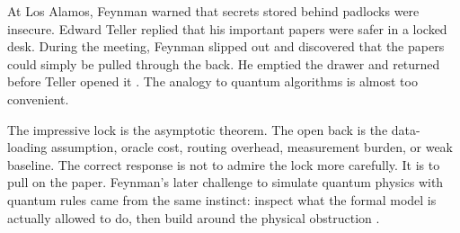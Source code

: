 At Los Alamos, Feynman warned that secrets stored behind padlocks were insecure. Edward Teller replied that his important papers were safer in a locked desk. During the meeting, Feynman slipped out and discovered that the papers could simply be pulled through the back. He emptied the drawer and returned before Teller opened it \citep{feynmanlosalamos}. The analogy to quantum algorithms is almost too convenient.

The impressive lock is the asymptotic theorem. The open back is the data-loading assumption, oracle cost, routing overhead, measurement burden, or weak baseline. The correct response is not to admire the lock more carefully. It is to pull on the paper. Feynman's later challenge to simulate quantum physics with quantum rules came from the same instinct: inspect what the formal model is actually allowed to do, then build around the physical obstruction \citep{feynman1982}.
